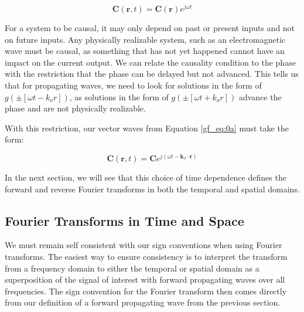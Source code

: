 \begin{equation}
\mathbf{C}\left(\mathbf{r},t\right) = \mathbf{C}\left(\mathbf{r}\right)e^{j\omega t}
\label{gf_eq:0a}
\end{equation}
\renewcommand{\baselinestretch}{2} \small\normalsize

For a system to be causal, it may only depend on past or present inputs and not on future inputs. Any physically realizable system, such as an electromagnetic wave must be causal, as something that has not yet happened cannot have an impact on the current output. We can relate the causality condition to the phase with the restriction that the phase can be delayed but not advanced. This tells us that for propagating waves, we need to look for solutions in the form of $g\left(\pm\left[\omega t - k_or\right]\right)$, as solutions in the form of $g\left(\pm\left[\omega t + k_or\right]\right)$ advance the phase and are not physically realizable. 

With this restriction, our vector waves from Equation \ref{gf_eq:0a} must take the form:

\begin{equation}
\mathbf{C}\left(\mathbf{r},t\right) = \mathbf{C}e^{j\left(\omega t - \mathbf{k}_o \cdot \mathbf{r} \right)}
\label{gf_eq:18b}
\end{equation}
\renewcommand{\baselinestretch}{2} \small\normalsize

In the next section, we will see that this choice of time dependence  defines the forward and reverse Fourier transforms in both the temporal and spatial domains.

\subsection {Fourier Transforms in Time and Space} \label{gf_sec:fourier_transform}
We must remain self consistent with our sign conventions when using Fourier transforms. The easiest way to ensure consistency is to interpret the transform from a frequency domain to either the temporal or spatial domain as a superposition of the signal of interest with forward propagating waves over all frequencies. The sign convention for the Fourier transform then comes directly from our definition of a forward propagating wave from the previous section.  

